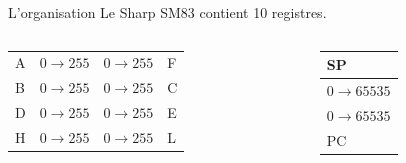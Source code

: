 \documentclass{beamer}
\begin{document}
    \begin{frame}{L'organisation}
        Le Sharp SM83 contient 10 registres.
        \begin{columns}
            \begin{column}{0.5\textwidth}
                \renewcommand{\arraystretch}{2} 
                \begin{tabular}{ m{0.1cm} | m{1.4cm} | m{1.4cm} | m{0.1cm} } 
                    \cline{2-3}
                    A
                    &$0 \rightarrow 255$
                    &$0 \rightarrow 255$
                    & F \\
                    \cline{2-3}
                    B
                    &$0 \rightarrow 255$
                    &$0 \rightarrow 255$
                    & C \\
                    \cline{2-3}
                    D
                    &$0 \rightarrow 255$
                    &$0 \rightarrow 255$
                    & E \\ 
                    \cline{2-3}
                    H
                    &$0 \rightarrow 255$
                    &$0 \rightarrow 255$
                    & L \\
                    \cline{2-3}
                \end{tabular}
            \end{column}
            \begin{column}{0.4\textwidth}
                \begin{center}
                    \renewcommand{\arraystretch}{1.2} 
                    \begin{tabular}{| m{1.8cm} |}
                        \multicolumn{1}{m{1.8cm}}{SP}\\ 
                        \hline
                        $0 \rightarrow 65535$\\
                        \hline
                        $0 \rightarrow 65535$\\
                        \hline
                        \multicolumn{1}{m{1.8cm}}{PC}\\ 
                    \end{tabular}
                \end{center}
            \end{column}
        \end{columns}
    \end{frame}
\end{document}
